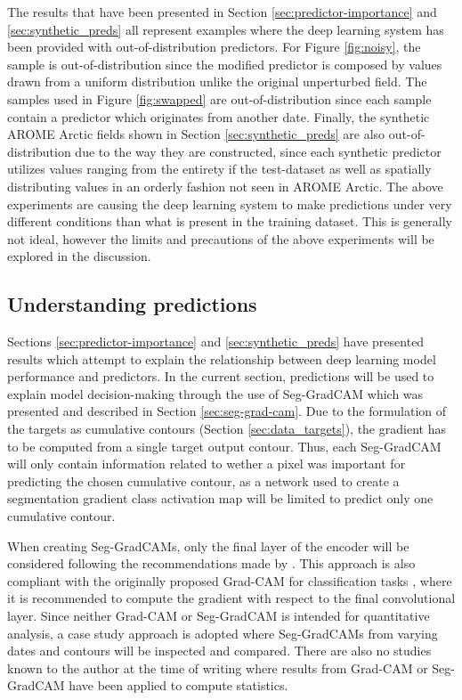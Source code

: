 \documentclass[../main/thesis.tex]{subfiles}
\begin{document}
The results that have been presented in Section \ref{sec:predictor-importance} and \ref{sec:synthetic_preds} all represent examples where the deep learning system has been provided with out-of-distribution predictors. For Figure \ref{fig:noisy}, the sample is out-of-distribution since the modified predictor is composed by values drawn from a uniform distribution unlike the original unperturbed field. The samples used in Figure \ref{fig:swapped} are out-of-distribution since each sample contain a predictor which originates from another date. Finally, the synthetic AROME Arctic fields shown in Section \ref{sec:synthetic_preds} are also out-of-distribution due to the way they are constructed, since each synthetic predictor utilizes values ranging from the entirety if the test-dataset as well as spatially distributing values in an orderly fashion not seen in AROME Arctic. The above experiments are causing the deep learning system to make predictions under very different conditions than what is present in the training dataset. This is generally not ideal, however the limits and precautions of the above experiments will be explored in the discussion.

\subsection{Understanding predictions}
Sections \ref{sec:predictor-importance} and \ref{sec:synthetic_preds} have presented results which attempt to explain the relationship between deep learning model performance and predictors. In the current section, predictions will be used to explain model decision-making through the use of Seg-GradCAM \citep{Vinogradova2020} which was presented and described in Section \ref{sec:seg-grad-cam}. Due to the formulation of the targets as cumulative contours (Section \ref{sec:data_targets}), the gradient has to be computed from a single target output contour. Thus, each Seg-GradCAM will only contain information related to wether a pixel was important for predicting the chosen cumulative contour, as a network used to create a segmentation gradient class activation map will be limited to predict only one cumulative contour. 

When creating Seg-GradCAMs, only the final layer of the encoder will be considered following the recommendations made by \citet{Vinogradova2020}. This approach is also compliant with the originally proposed Grad-CAM for classification tasks \citep{Selvaraju2016}, where it is recommended to compute the gradient with respect to the final convolutional layer. Since neither Grad-CAM or Seg-GradCAM is intended for quantitative analysis, a case study approach is adopted where Seg-GradCAMs from varying dates and contours will be inspected and compared. There are also no studies known to the author at the time of writing where results from Grad-CAM or Seg-GradCAM have been applied to compute statistics.
\end{document}
